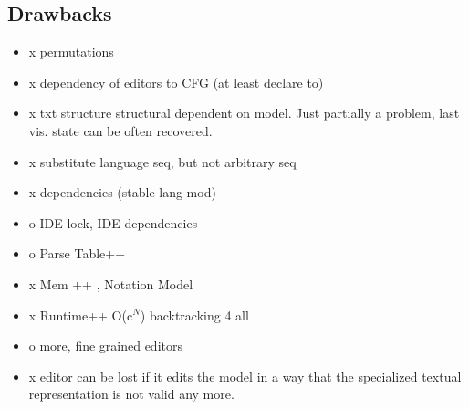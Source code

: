 \subsection{Drawbacks}
\begin{itemize}
	\item x permutations
	\item x dependency of editors to CFG (at least declare to)
	\item x txt structure structural dependent on model. Just partially a problem, last vis. state can be often recovered.
	\item x substitute language seq, but not arbitrary seq
	\item x dependencies (stable lang mod)
	\item o IDE lock, IDE dependencies
	\item o Parse Table++
	\item x Mem ++ , Notation Model
	\item x Runtime++ O(c$^N$) backtracking 4 all
	\item o more, fine grained editors
	\item x editor can be lost if it edits the model in a way that the specialized textual representation is not valid any more.
\end{itemize}